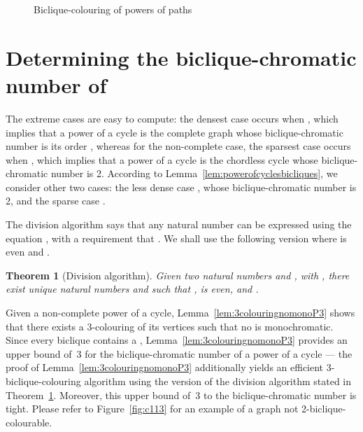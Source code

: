 \documentclass{article}
\newtheorem{theorem}{Theorem}
\begin{document}
\begin{figure}[t]
\centering
	\qquad
	\caption{Biclique-colouring of
	powers of paths}
	\label{fig:pathbicliquecolouring}
\end{figure}


\section{Determining the biclique-chromatic number of~}
\label{sec:bicliqueupperboundpowerofcycle}

The extreme cases are easy to compute: the densest case occurs when
, which implies that a power of a cycle  is the complete
graph  whose biclique-chromatic number is its order , whereas for the
non-complete case, the sparsest case  occurs when , which implies
that a power of a cycle  is the chordless cycle  whose
biclique-chromatic number is 2.
According to Lemma~\ref{lem:powerofcyclesbicliques}, we consider other two
cases:
the less dense case , whose biclique-chromatic number is
2, and the sparse case .

The division algorithm says that any
natural number  can be expressed using the equation , with a
requirement that . We shall use the following version where  is
even and .


\begin{theorem}[Division algorithm]
\label{thm:division}
Given two natural numbers  and ,
with , there exist unique natural numbers  and  such that
,  is even, and .
\end{theorem}


Given a non-complete power of a cycle, Lemma~\ref{lem:3colouringnomonoP3} shows
that there exists a 3-colouring of its vertices such that no  is
monochromatic. Since every biclique contains a , 
Lemma~\ref{lem:3colouringnomonoP3} provides an upper bound of~3 for the 
biclique-chromatic number of a power of a cycle --- the proof of 
Lemma~\ref{lem:3colouringnomonoP3} additionally yields an efficient 
3-biclique-colouring algorithm using the version of the division 
algorithm stated in Theorem~\ref{thm:division}. 
Moreover, this upper bound of~3 to the biclique-chromatic number 
is tight. Please refer to Figure~\ref{fig:c113} for an example of a graph 
not 2-biclique-colourable.
\end{document}
